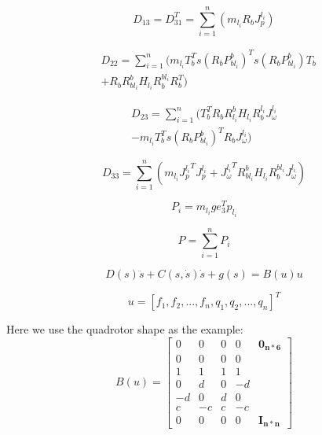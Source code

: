 \documentclass{jarticle}
\begin{document}
\begin{equation}
  D_{13} = D_{31}^T = \sum_{i=1}^{n}(m_{l_i} R_b J_p^{l_i})
\end{equation}

\begin{eqnarray}
  & D_{22} = \sum_{i=1}^{n}(m_{l_i} T_b^T s(R_b P_{bl_i}^b)^T s(R_b P_{bl_i}^b) T_b \\ \nonumber
  & + R_b R_{bl_i}^b H_{l_i} R_b^{bl_i} R_b^T)
\end{eqnarray}

\begin{eqnarray}
  D_{23} = \sum_{i=1}^{n}(T_b^T R_b R_{l_i}^b H_{l_i} R_b^{l_i} J_\omega^{l_i} \\
  \nonumber
  - m_{l_i} T_b^T s(R_b P_{bl_i}^b)^T R_b J_\omega^{l_i})
\end{eqnarray}

\begin{equation}
  D_{33} = \sum_{i=1}^{n}(m_{l_i} {J_p^{l_i}}^T J_p^{l_i}
  + {J_\omega^{l_i}}^T R_{bl_i}^b H_{l_i} R_b^{bl_i} J_\omega^{l_i})
\end{equation}

\begin{equation}
  P_i = m_{l_i} g e_3^T p_{l_i}
\end{equation}

\begin{equation}
  P = \sum_{i=1}^{n}{P_i}
\end{equation}

\begin{equation}
  D(s) \ddot{s} + C(s, \dot{s}) \dot{s} + g(s) = B(u) u
\end{equation}

\begin{equation}
  u = [f_1, f_2, ..., f_n, q_1, q_2, ..., q_n]^T
\end{equation}

Here we use the quadrotor shape as the example:
\begin{equation}
  B(u) = \begin{bmatrix}
    0 & 0 & 0 & 0 & \bm{0_{n*6}} \\
    0 & 0 & 0 & 0  \\
    1 & 1 & 1 & 1  \\
    0 & d & 0 & -d \\
    -d & 0 & d & 0 \\
    c & -c & c & -c \\
    0 & 0 & 0 & 0 & \bm{I_{n*n}}
  \end{bmatrix}
\end{equation}
\end{document}
